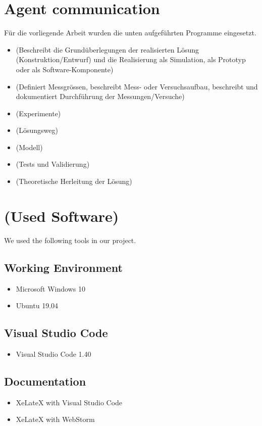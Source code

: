 \section{Agent communication}\label{reduced_action_space}
Für die vorliegende Arbeit wurden die unten aufgeführten Programme eingesetzt.





\begin{itemize}
\item (Beschreibt die Grundüberlegungen der realisierten Lösung (Konstruktion/Entwurf) und die Realisierung als Simulation, als Prototyp oder als Software-Komponente)
\item (Definiert Messgrössen, beschreibt Mess- oder Versuchsaufbau, beschreibt und dokumentiert Durchführung der Messungen/Versuche)
\item (Experimente)
\item (Lösungsweg)
\item (Modell)
\item (Tests und Validierung)
\item (Theoretische Herleitung der Lösung)
\end{itemize}

\section{(Used Software)}\label{software}
We used the following tools in our project.

\subsection*{Working Environment}\label{os}
\begin{itemize}
	\item Microsoft Windows 10
	\item Ubuntu 19.04
\end{itemize}

\subsection*{Visual Studio Code}\label{vsc}
\begin{itemize}
	\item Visual Studio Code 1.40
\end{itemize}

\subsection*{Documentation}\label{dokutools}
\begin{itemize}
	\item XeLateX with Visual Studio Code
	\item XeLateX with WebStorm
\end{itemize}


